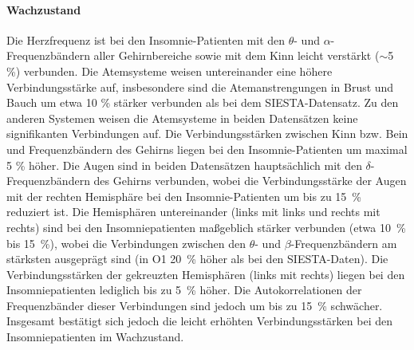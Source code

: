 \paragraph{Wachzustand} Die Herzfrequenz ist bei den Insomnie-Patienten mit den $\theta$- und $\alpha$-Frequenzbändern aller Gehirnbereiche sowie mit dem Kinn leicht verstärkt ($\sim$5 \%) verbunden. Die Atemsysteme weisen untereinander eine höhere Verbindungsstärke auf, insbesondere sind die Atemanstrengungen in Brust und Bauch um etwa 10 \% stärker verbunden als bei dem SIESTA-Datensatz. Zu den anderen Systemen weisen die Atemsysteme in beiden Datensätzen keine signifikanten Verbindungen auf. Die Verbindungsstärken zwischen Kinn bzw. Bein und Frequenzbändern des Gehirns liegen bei den Insomnie-Patienten um maximal 5 \% höher. Die Augen sind in beiden Datensätzen hauptsächlich mit den $\delta$-Frequenzbändern des Gehirns verbunden, wobei die Verbindungsstärke der Augen mit der rechten Hemisphäre bei den Insomnie-Patienten um bis zu 15~\% reduziert ist. Die Hemisphären untereinander (links mit links und rechts mit rechts) sind bei den Insomniepatienten maßgeblich stärker verbunden (etwa 10~\% bis 15~\%), wobei die Verbindungen zwischen den $\theta$- und $\beta$-Frequenzbändern am stärksten ausgeprägt sind (in O1 20~\% höher als bei den SIESTA-Daten). Die Verbindungsstärken der gekreuzten Hemisphären (links mit rechts) liegen bei den Insomniepatienten lediglich bis zu 5~\% höher. Die Autokorrelationen der Frequenzbänder dieser Verbindungen sind jedoch um bis zu 15~\% schwächer. Insgesamt bestätigt sich jedoch die leicht erhöhten Verbindungsstärken bei den Insomniepatienten im Wachzustand. 

